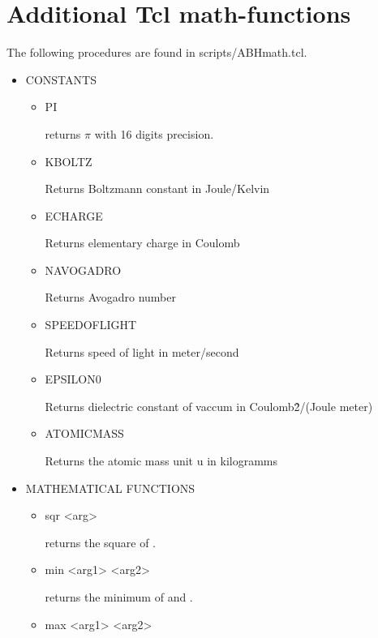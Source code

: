 \section{Additional Tcl math-functions}
The following procedures are found in scripts/ABHmath.tcl.
\begin{itemize}
 \item
  CONSTANTS
  \begin{itemize}
   \item
\begin{code}
PI
\end{code}
    returns $\pi$ with 16 digits precision.
   \item
\begin{code}
KBOLTZ
\end{code}
Returns Boltzmann constant in Joule/Kelvin
   \item
\begin{code}
ECHARGE
\end{code}
    Returns elementary charge in Coulomb
   \item
\begin{code}
NAVOGADRO
\end{code}
    Returns Avogadro number
   \item
\begin{code}
SPEEDOFLIGHT
\end{code}
    Returns speed of light in meter/second
   \item
\begin{code}
EPSILON0
\end{code}
Returns dielectric constant of vaccum in Coulomb\^2/(Joule meter)
   \item
\begin{code}
ATOMICMASS
\end{code}
    Returns the atomic mass unit u in kilogramms
  \end{itemize}
 \item
  MATHEMATICAL FUNCTIONS
  \begin{itemize}
   \item
\begin{code}
sqr <arg>
\end{code}
    returns the square of .
   \item
\begin{code}
min <arg1> <arg2>
\end{code}
    returns the minimum of  and .
   \item
\begin{code}
max <arg1> <arg2>

\end{code}
\end{itemize}
\end{itemize}
